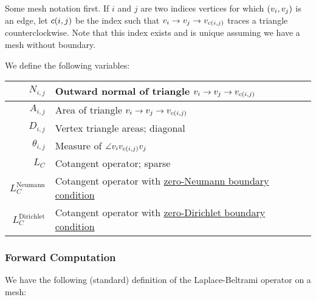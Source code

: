 Some mesh notation first. If \(i\) and \(j\) are two indices vertices for which \(\pof{v_i, v_j}\) is an edge, let \(c\pof{i, j}\) be the index such that \(v_i \to v_j \to v_{c\pof{i, j}}\) traces a triangle counterclockwise. Note that this index exists and is unique assuming we have a mesh without boundary.

We define the following variables:
\begin{center}\begin{tabular}{r|l}
	\(N_{i, j}\) & Outward normal of triangle \(v_i \to v_j \to v_{c\pof{i, j}}\) \\ \hline
	\(A_{i, j}\) & Area of triangle \(v_i \to v_j \to v_{c\pof{i, j}}\) \\ \hline
	\(D_{i, j}\) & Vertex triangle areas; diagonal \\ \hline
	\(\theta_{i, j}\) & Measure of \(\angle v_iv_{c\pof{i, j}}v_j\) \\ \hline
	\(L_C\) & Cotangent operator; sparse \\ \hline
	\(L_C^{\text{Neumann}}\) & Cotangent operator with \href{https://en.wikipedia.org/wiki/Neumann_boundary_condition}{zero-Neumann boundary condition} \\ \hline
	\(L_C^{\text{Dirichlet}}\) & Cotangent operator with \href{https://en.wikipedia.org/wiki/Dirichlet_boundary_condition}{zero-Dirichlet boundary condition} \\ \hline
\end{tabular}\end{center}

\subsubsection{Forward Computation}

We have the following (standard) definition of the Laplace-Beltrami operator on a mesh:

